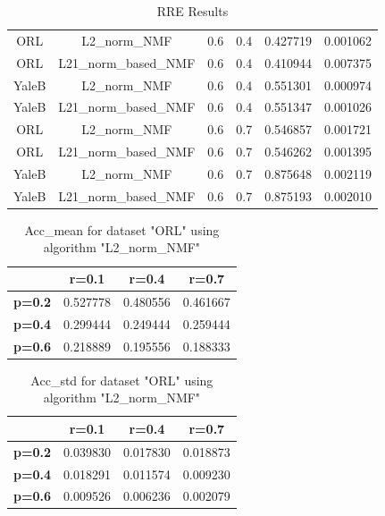 \begin{table}[p]
\begin{tabular}{cccccc}
ORL              & L2\_norm\_NMF         & 0.6        & 0.4        & 0.427719           & 0.001062          \\
ORL              & L21\_norm\_based\_NMF & 0.6        & 0.4        & 0.410944           & 0.007375          \\
YaleB            & L2\_norm\_NMF         & 0.6        & 0.4        & 0.551301           & 0.000974          \\
YaleB            & L21\_norm\_based\_NMF & 0.6        & 0.4        & 0.551347           & 0.001026          \\
ORL              & L2\_norm\_NMF         & 0.6        & 0.7        & 0.546857           & 0.001721          \\
ORL              & L21\_norm\_based\_NMF & 0.6        & 0.7        & 0.546262           & 0.001395          \\
YaleB            & L2\_norm\_NMF         & 0.6        & 0.7        & 0.875648           & 0.002119          \\
YaleB            & L21\_norm\_based\_NMF & 0.6        & 0.7        & 0.875193           & 0.002010          \\ \hline
\end{tabular}
\caption{RRE Results}
\end{table}



\begin{table}[p]
\centering
\begin{tabular}{|c|c|c|c|}
\hline
 & \textbf{r=0.1} & \textbf{r=0.4} & \textbf{r=0.7} \\
\hline
\textbf{p=0.2} & 0.527778 & 0.480556 & 0.461667 \\
\hline
\textbf{p=0.4} & 0.299444 & 0.249444 & 0.259444 \\
\hline
\textbf{p=0.6} & 0.218889 & 0.195556 & 0.188333 \\
\hline
\end{tabular}
\caption{Acc\_mean for dataset "ORL" using algorithm "L2\_norm\_NMF"}
\end{table}

\begin{table}[p]
\centering
\begin{tabular}{|c|c|c|c|}
\hline
 & \textbf{r=0.1} & \textbf{r=0.4} & \textbf{r=0.7} \\
\hline
\textbf{p=0.2} & 0.039830 & 0.017830 & 0.018873 \\
\hline
\textbf{p=0.4} & 0.018291 & 0.011574 & 0.009230 \\
\hline
\textbf{p=0.6} & 0.009526 & 0.006236 & 0.002079 \\
\hline
\end{tabular}
\caption{Acc\_std for dataset "ORL" using algorithm "L2\_norm\_NMF"}
\end{table}

